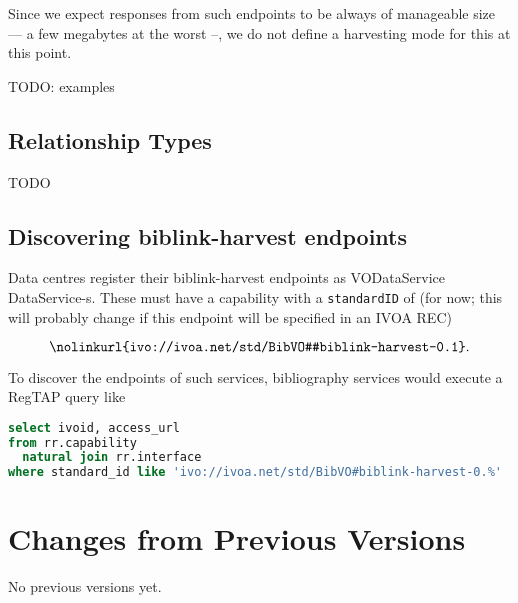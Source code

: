 \documentclass[11pt,a4paper]{ivoa}
\begin{document}
Since we expect responses from such endpoints to be always of manageable
size –– a few megabytes at the worst --, we do not define a harvesting
mode for this at this point.

TODO: examples

\subsection{Relationship Types}

TODO

\subsection{Discovering biblink-harvest endpoints}

Data centres register their biblink-harvest endpoints as VODataService
\citep{2021ivoa.spec.1102D} DataService-s.  These must have a capability
with a \verb|standardID| of (for now; this will probably change if this
endpoint will be specified in an IVOA REC)

$$\nolinkurl{ivo://ivoa.net/std/BibVO#biblink-harvest-0.1}.$$

To discover the endpoints of such services, bibliography services would
execute a RegTAP query like

\begin{lstlisting}[language=SQL]
select ivoid, access_url
from rr.capability
  natural join rr.interface
where standard_id like 'ivo://ivoa.net/std/BibVO#biblink-harvest-0.%'
\end{lstlisting}


\appendix
\section{Changes from Previous Versions}

No previous versions yet.



\end{document}
